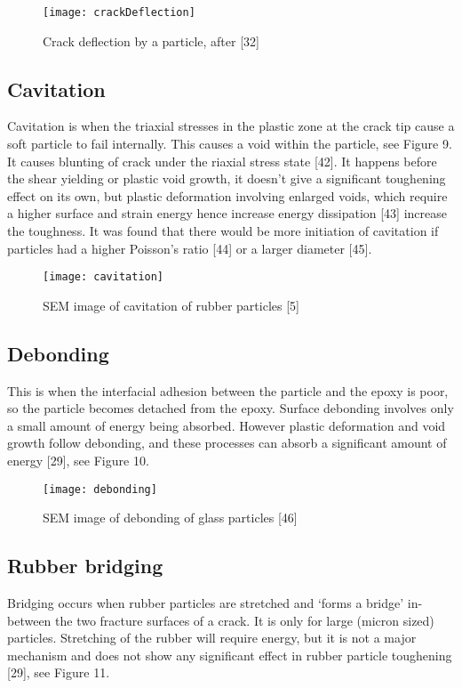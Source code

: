 \documentclass[numbers=noendperiod,chapterprefix=on]{icldt} %
\begin{document}
\begin{figure}[!htpb]
\centering
\texttt{[image: crackDeflection]}
\caption{Crack deflection by a particle, after [32]} %
\end{figure}

\subsection{Cavitation} 
Cavitation is when the triaxial stresses in the plastic zone at the crack tip cause a soft particle to fail internally. This causes a void within the particle, see Figure 9. It causes blunting of crack under the riaxial stress state [42]. It happens before the shear yielding or plastic void growth, it doesn’t give a significant toughening effect on its own, but plastic deformation involving enlarged voids, which require a higher surface and strain energy hence increase energy dissipation [43] increase the toughness. It was found that there would be more initiation of cavitation if particles had a higher Poisson’s ratio [44] or a larger diameter [45].

\begin{figure}[!htpb]
\centering
\texttt{[image: cavitation]}
\caption{SEM image of cavitation of rubber particles [5] } %
\end{figure}

\subsection{Debonding}
This is when the interfacial adhesion between the particle and the epoxy is poor, so the particle becomes detached from the epoxy. Surface debonding involves only a small amount of energy being absorbed. However plastic deformation and void growth follow debonding, and these processes can absorb a significant amount of energy [29], see Figure 10. 

\begin{figure}[!htpb]
\centering
\texttt{[image: debonding]}
\caption{SEM image of debonding of glass particles [46]} %
\end{figure}

\subsection{Rubber bridging}
Bridging occurs when rubber particles are stretched and ‘forms a bridge’ in-between the two fracture surfaces of a crack. It is only for large (micron sized) particles. Stretching of the rubber will require energy, but it is not a major mechanism and does not show any significant effect in rubber particle toughening [29], see Figure 11. 
\end{document}
